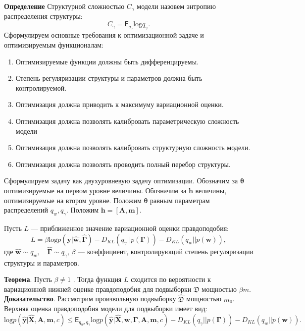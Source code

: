 \documentclass[12pt]{article}
\begin{document}
\textbf{Определение} Структурной сложностью $C_\gamma$ модели назовем энтропию распределения структуры:
\[
    C_\gamma = \mathsf{E}_{q_\gamma} \text{log}q_\gamma.
\]
Сформулируем основные требования к оптимизационной задаче и оптимизируемым функционалам:
\begin{enumerate}
\item Оптимизируемые функции должны быть дифференцируемы.
\item Степень регуляризации структуры и параметров должна быть контролируемой.
\item Оптимизация должна приводить к максимуму вариационной оценки.
\item Оптимизация должна позволять калибровать параметрическую сложность модели
\item Оптимизация должна позволять калибровать структурную сложность модели.
\item Оптимизация должна позволять проводить полный перебор структуры.
\end{enumerate}

Сформулируем задачу как двухуровневую задачу оптимизации. Обозначим за  $\boldsymbol{\theta}$ оптимизируемые на первом уровне величины. Обозначим за $\mathbf{h}$ величины, оптимизируемые на втором уровне.
Положим $\boldsymbol{\theta}$ равным параметрам распределений $q_w, q_\gamma$. 
Положим $\mathbf{h} = [\mathbf{A}, \mathbf{m}].$

Пусть $L$ --- приближенное значение вариационной оценки правдоподобия:
\[
    L = \beta\text{log} p(\mathbf{y}|\hat{\mathbf{w}}, \hat{\boldsymbol{\Gamma}}) - {D_{KL}}(q_\gamma||p(\boldsymbol{\Gamma})) - {D_{KL}}(q_{w}||p(\mathbf{w})),
\]
где $\hat{\mathbf{w}} \sim q_w, \quad \hat{\boldsymbol{\Gamma}} \sim q_\gamma$, $\beta$ --- коэффициент, контролирующий степень регуляризации структуры и параметров.


\textbf{Теорема}. Пусть $\beta \neq 1$ .
Тогда функция $L$ сходится по вероятности к вариационной нижней оценке правдоподобия для подвыборки  $\mathfrak{D}$ 
мощностью $\beta m$.\\
\textbf{Доказательство}. Рассмотрим произвольную подвыборку $\hat{\mathfrak{D}}$ мощностью $m_0$. Верхняя оценка правдоподобия модели для подвыборки имеет вид:
\[
 \text{log} p(\hat{\mathbf{y}}|\hat{\mathbf{X}},\mathbf{A},\mathbf{m}, c)  \leq \mathsf{E}_{q_w,q_\gamma}\text{log} p(\hat{\mathbf{y}}|\hat{\mathbf{X}},\mathbf{w}, \boldsymbol{\Gamma}, \mathbf{A},\mathbf{m}, c) - {D_{KL}}(q_\gamma||p(\boldsymbol{\Gamma})) - {D_{KL}}(q_{w}||p(\mathbf{w})).
\]
\end{document}
